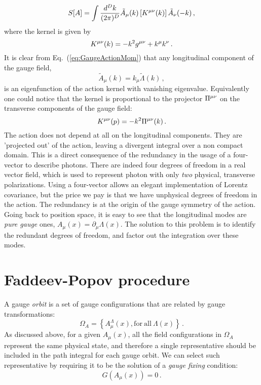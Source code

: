 \begin{equation}
  \label{eq:GaugeActionMom}
  S[A] = \int \frac{d^Dk}{(2\pi)^D} \tilde{A}_\mu(k) \left[
    K^{\mu\nu}(k)
    \right] \tilde{A}_\nu(-k)\, ,
\end{equation}
where the kernel is given by
\begin{equation}
  \label{eq:GaugeKernel}
  K^{\mu\nu}(k) = -k^2 g^{\mu\nu} + k^\mu k^\nu\, .
\end{equation}
It is clear from Eq.~(\ref{eq:GaugeActionMom}) that any longitudinal
component of the gauge field, 
\[
\tilde{A}_\mu(k) = k_\mu \tilde{\Lambda}(k)\, ,
\]
is an eigenfunction of the action kernel with vanishing
eigenvalue. Equivalently one could notice that the kernel is
proportional to the projector $\Pi^{\mu\nu}$ on the transverse components
of the gauge field:
\begin{equation}
  \label{eq:GaugeProj}
  K^{\mu\nu}(p) = -k^2 \Pi^{\mu\nu}(k)\, .
\end{equation}
The action does not depend at all on the longitudinal components.
They are 'projected out' of the action, leaving a divergent integral
over a non compact domain. This is a direct consequence of the
redundancy in the usage of a four-vector to describe photons. There
are indeed four degrees of freedom in a real vector field, which is
used to represent photon with only {\em two} physical, transverse
polarizations. Using a four-vector allows an elegant implementation of
Lorentz covariance, but the price we pay is that we have unphysical
degrees of freedom in the action. The redundancy is at the origin of
the gauge symmetry of the action. Going back to position space, it is
easy to see that the longitudinal modes are {\em pure gauge} ones, \ie
$A_\mu(x)=\partial_\mu \Lambda(x)$. The solution to this problem is to
identify the redundant degrees of freedom, and factor out the
integration over these modes. 

\section{Faddeev-Popov procedure}
\label{sec:fadd-popov-proc}

A gauge {\em orbit} is a set of gauge configurations that are related
by gauge transformations: 
\begin{equation}
  \label{eq:GaugeOrbit}
  \Omega_A =\left\{
    A^\Lambda_\mu(x), \mathrm{for\ all}\ \Lambda(x)
    \right\}\, .
\end{equation}
As discussed above, for a given $A_\mu(x)$, all the field
configurations in $\Omega_A$ represent the same physical state, and
therefore a single representative should be included in the path
integral for each gauge orbit. We can select such representative by
requiring it to be the solution of a {\em gauge fixing} condition: 
\begin{equation}
  \label{eq:GaugeFixing}
  G\left(A_\mu(x)\right) = 0\, .
\end{equation}


